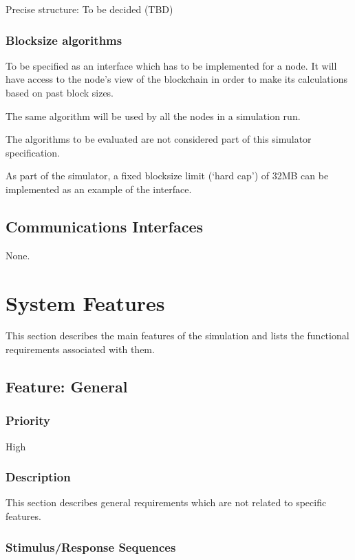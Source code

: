 \documentclass{scrreprt}
\begin{document}
Precise structure: To be decided (TBD)

\subsection{Blocksize algorithms}
To be specified as an interface which has to be implemented for a node.
It will have access to the node's view of the blockchain in order to make
its calculations based on past block sizes.

The same algorithm will be used by all the nodes in a simulation run.

The algorithms to be evaluated are not considered part of this simulator
specification.

As part of the simulator, a fixed blocksize limit (`hard cap') of 32MB
can be implemented as an example of the interface.

\section{Communications Interfaces}
None.


\chapter{System Features}

This section describes the main features of the simulation and lists the
functional requirements associated with them.



\section{Feature: General}

\subsection{Priority}

High

\subsection{Description}

This section describes general requirements which are not related to
specific features.


\subsection{Stimulus/Response Sequences}
\end{document}
